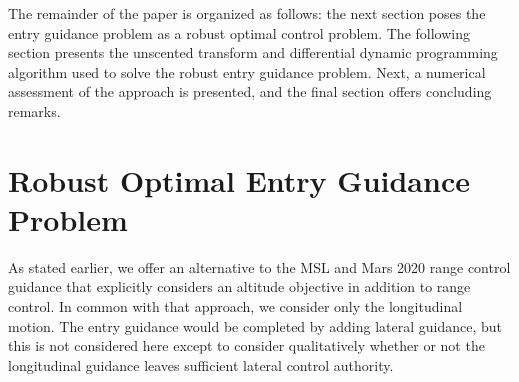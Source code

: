 \documentclass[journal ]{new-aiaa}
\begin{document}


The remainder of the paper is organized as follows: the next section poses the entry guidance problem as a robust optimal control problem. The following section presents the unscented transform and differential dynamic programming algorithm used to solve the robust entry guidance problem. Next, a numerical assessment of the approach is presented, and the final section offers concluding remarks. 

\section*{Robust Optimal Entry Guidance Problem}
As stated earlier, we offer an alternative to the MSL and Mars 2020 range control guidance that explicitly considers an altitude objective in addition to range control. In common with that approach, we consider only the longitudinal motion. The entry guidance would be completed by adding lateral guidance, but this is not considered here except to consider qualitatively whether or not the longitudinal guidance leaves sufficient lateral control authority.
\end{document}
